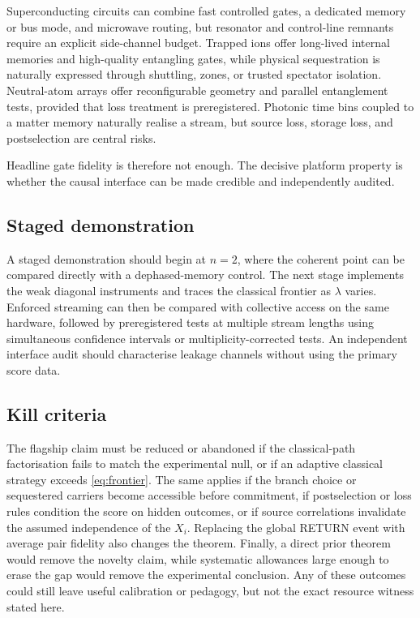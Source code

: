 Superconducting circuits can combine fast controlled gates, a dedicated memory or bus mode, and microwave routing, but resonator and control-line remnants require an explicit side-channel budget. Trapped ions offer long-lived internal memories and high-quality entangling gates, while physical sequestration is naturally expressed through shuttling, zones, or trusted spectator isolation. Neutral-atom arrays offer reconfigurable geometry and parallel entanglement tests, provided that loss treatment is preregistered. Photonic time bins coupled to a matter memory naturally realise a stream, but source loss, storage loss, and postselection are central risks.

Headline gate fidelity is therefore not enough. The decisive platform property is whether the causal interface can be made credible and independently audited.

\subsection{Staged demonstration}

A staged demonstration should begin at $n=2$, where the coherent point can be compared directly with a dephased-memory control. The next stage implements the weak diagonal instruments and traces the classical frontier as $\lambda$ varies. Enforced streaming can then be compared with collective access on the same hardware, followed by preregistered tests at multiple stream lengths using simultaneous confidence intervals or multiplicity-corrected tests. An independent interface audit should characterise leakage channels without using the primary score data.

\subsection{Kill criteria}

The flagship claim must be reduced or abandoned if the classical-path factorisation fails to match the experimental null, or if an adaptive classical strategy exceeds \eqref{eq:frontier}. The same applies if the branch choice or sequestered carriers become accessible before commitment, if postselection or loss rules condition the score on hidden outcomes, or if source correlations invalidate the assumed independence of the $X_i$. Replacing the global RETURN event with average pair fidelity also changes the theorem. Finally, a direct prior theorem would remove the novelty claim, while systematic allowances large enough to erase the gap would remove the experimental conclusion. Any of these outcomes could still leave useful calibration or pedagogy, but not the exact resource witness stated here.
